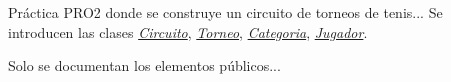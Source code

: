 Práctica P\+R\+O2 donde se construye un circuito de torneos de tenis... Se introducen las clases {\itshape \mbox{\hyperlink{class_circuito}{Circuito}}}, {\itshape \mbox{\hyperlink{class_torneo}{Torneo}}}, {\itshape \mbox{\hyperlink{class_categoria}{Categoria}}}, {\itshape \mbox{\hyperlink{class_jugador}{Jugador}}}.

Solo se documentan los elementos públicos... 